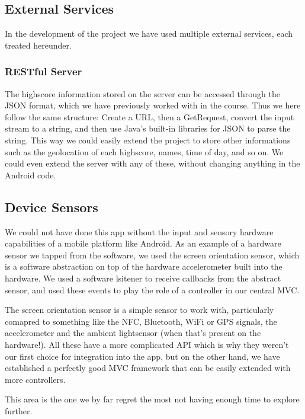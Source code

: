 \documentclass[a4paper, 12pt]{article}
\begin{document}
\subsection{External Services}
In the development of the project we have used multiple external
services, each treated hereunder.

\subsubsection{RESTful Server}
The highscore information stored on the server can be accessed through
the JSON format, which we have previously worked with in the
course. Thus we here follow the same structure: Create a URL, then a
GetRequest, convert the input stream to a string, and then use Java's
built-in libraries for JSON to parse the string. This way we could
easily extend the project to store other informations such as the
geolocation of each highscore, names, time of day, and so on. We could
even extend the server with any of these, without changing anything in
the Android code.


\subsection{Device Sensors}
We could not have done this app without the input and sensory hardware
capabilities of a mobile platform like Android. As an example of a
hardware sensor we tapped from the software, we used the screen
orientation sensor, which is a software abstraction on top of the
hardware accelerometer built into the hardware. We used a software
lsitener to receive callbacks from the abstract sensor, and used these
events to play the role of a controller in our central MVC.

The screen orientation sensor is a simple sensor to work with,
particularly comapred to something like the NFC, Bluetooth, WiFi or
GPS signals, the accelerometer and the ambient lightsensor (when
that's present on the hardware!). All these have a more complicated
API which is why they weren't our first choice for integration into
the app, but on the other hand, we have established a perfectly good
MVC framework that can be easily extended with more controllers.

This area is the one we by far regret the most not having enough time
to explore further.
\end{document}
